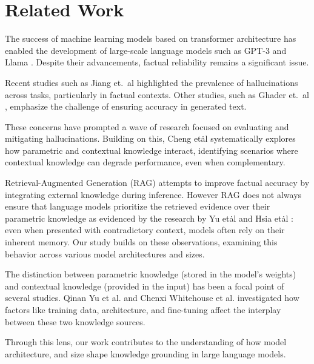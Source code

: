 \section{Related Work}

The success of machine learning models based on transformer architecture \cite{attention_is_all_you_need} has enabled the development of large-scale language models such as GPT-3 \cite{gpt3} and Llama \cite{llama}.
Despite their advancements, factual reliability remains a significant issue.

Recent studies such as Jiang et.\ al \cite{how_can_we_know} highlighted the prevalence of hallucinations across tasks, particularly in factual contexts.
Other studies, such as Ghader et.\ al \cite{can_rag_models_reason}, emphasize the challenge of ensuring accuracy in generated text.

These concerns have prompted a wave of research focused on evaluating and mitigating hallucinations.
Building on this, Cheng et\. al \cite{understanding_the_interplay} systematically explores how parametric and contextual knowledge interact, identifying scenarios where contextual knowledge can degrade performance, even when complementary.

Retrieval-Augmented Generation (RAG) \cite{rag} attempts to improve factual accuracy by integrating external knowledge during inference.
However RAG does not always ensure that language models prioritize the retrieved evidence over their parametric knowledge as evidenced by the research by Yu et\. al and Hsia et\. al \cite{ragged,factual_recall}: even when presented with contradictory context, models often rely on their inherent memory.
Our study builds on these observations, examining this behavior across various model architectures and sizes.

The distinction between parametric knowledge (stored in the model's weights) and contextual knowledge (provided in the input) has been a focal point of several studies.
Qinan Yu et al. \cite{factual_recall} and Chenxi Whitehouse et al. \cite{knowledge_grounding_retrieval_augmented} investigated how factors like training data, architecture, and fine-tuning affect the interplay between these two knowledge sources.

Through this lens, our work contributes to the understanding of how model architecture, and size shape knowledge grounding in large language models.

